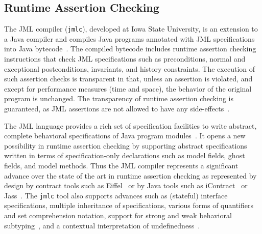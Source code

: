 \documentclass{entcs}
\begin{document}
%



\subsection{Runtime Assertion Checking}
\label{jmlc}

The JML compiler (\texttt{jmlc}), developed at Iowa State University,
is an extension to a Java compiler and compiles Java programs
annotated with JML specifications into Java
bytecode~\cite{Cheon-Leavens02b}.  The compiled bytecode includes
runtime assertion checking instructions that check JML specifications
such as preconditions, normal and exceptional postconditions,
invariants, and history constraints.  The execution of such assertion
checks is transparent in that, unless an assertion is violated, and
except for performance measures (time and space), the behavior of the
original program is unchanged.  The transparency of runtime assertion
checking is guaranteed, as JML assertions are not allowed to have any
side-effects~\cite{Leavens-etal03a}.

The JML language provides a rich set of specification facilities to
write abstract, complete behavioral specifications of Java program
modules~\cite{Leavens-etal03a}.  It opens a new possibility in runtime
assertion checking by supporting abstract specifications written in
terms of specification-only declarations such as model fields, ghost
fields, and model methods.  Thus the JML compiler represents a
significant advance over the state of the art in runtime assertion
checking as represented by design by contract tools such as
Eiffel~\cite{Meyer97} or by Java tools such as
iContract~\cite{Kramer98} or Jass~\cite{Bartetzko-etal01}.  The
\texttt{jmlc} tool also supports advances such as (stateful) interface
specifications, multiple inheritance of specifications, various forms
of quantifiers and set comprehension notation, support for strong and
weak behavioral subtyping~\cite{Liskov-Wing94,Dhara-Leavens96}, and a
contextual interpretation of undefinedness~\cite{Leavens-etal03a}.
\end{document}
